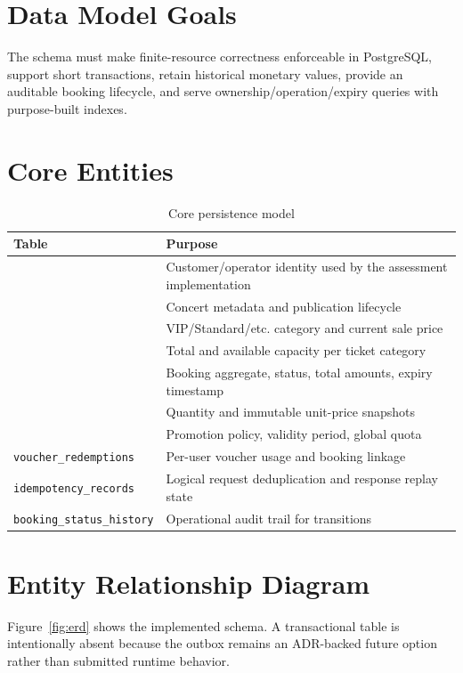 \section{Data Model Goals}
The schema must make finite-resource correctness enforceable in PostgreSQL,
support short transactions, retain historical monetary values, provide an
auditable booking lifecycle, and serve ownership/operation/expiry queries with
purpose-built indexes.

\section{Core Entities}
\begin{table}[H]
\centering
\caption{Core persistence model}
\begin{tabularx}{\textwidth}{p{}Y}
\toprule
\textbf{Table} & \textbf{Purpose} \\
\midrule
{} & Customer/operator identity used by the assessment implementation \\
 & Concert metadata and publication lifecycle \\
 & VIP/Standard/etc. category and current sale price \\
 & Total and available capacity per ticket category \\
 & Booking aggregate, status, total amounts, expiry timestamp \\
 & Quantity and immutable unit-price snapshots \\
 & Promotion policy, validity period, global quota \\
\nolinkurl{voucher_redemptions} & Per-user voucher usage and booking linkage \\
\nolinkurl{idempotency_records} & Logical request deduplication and response replay state \\
\nolinkurl{booking_status_history} & Operational audit trail for transitions \\
\bottomrule
\end{tabularx}
\end{table}

\section{Entity Relationship Diagram}
Figure~\ref{fig:erd} shows the implemented schema. A transactional
 table is intentionally absent because the outbox remains
an ADR-backed future option rather than submitted runtime behavior.

